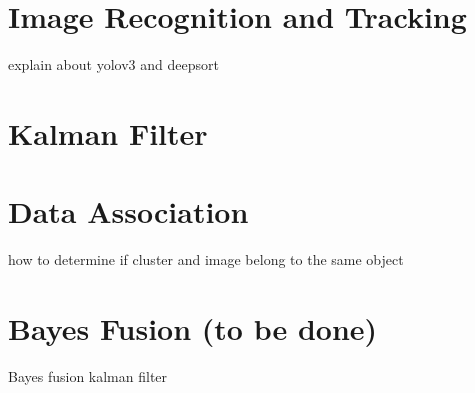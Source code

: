 \section{Image Recognition and Tracking}\label{sec:2-img_recognition}
explain about yolov3 and deepsort

\section{Kalman Filter}\label{sec:2-kalman_filter}


\section{Data Association}\label{sec:2-association}
how to determine if cluster and image belong to the same object

\section{Bayes Fusion \small(to be done)}\label{sec:2-bayes_fusion}
Bayes fusion kalman filter 